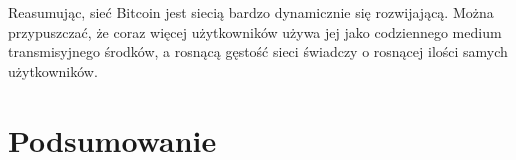 \documentclass[12pt, twoside, final, openany]{mgr}
\begin{document}
\indent Reasumując, sieć Bitcoin jest siecią bardzo dynamicznie się rozwijającą. Można przypuszczać, że coraz więcej użytkowników używa jej jako codziennego medium transmisyjnego środków, a rosnącą gęstość sieci świadczy o rosnącej ilości samych użytkowników. 


\chapter*{Podsumowanie}




\listoffigures
\listoftables
\end{document}
